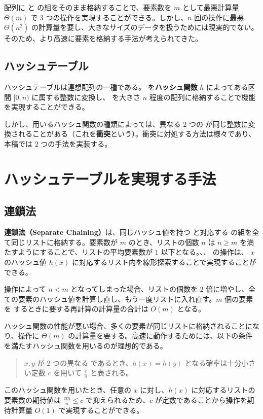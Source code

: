 \documentclass[dvipdfmx,a4j,10pt]{jarticle}
\begin{document}
配列に  と  の組をそのまま格納することで、要素数を $m$ として最悪計算量 $\Theta (m)$ で $3$ つの操作を実現することができる。しかし、$n$ 回の操作に最悪 $\Theta (n^2)$ の計算量を要し、大きなサイズのデータを扱うためには現実的でない。そのため、より高速に要素を格納する手法が考えられてきた。

\subsection{ハッシュテーブル}

ハッシュテーブルは連想配列の一種である。 を\textbf{ハッシュ関数} $h$ によってある区間 $[0, n)$ に属する整数に変換し、 を大きさ $n$ 程度の配列に格納することで機能を実現することができる。

しかし、用いるハッシュ関数の種類によっては、異なる $2$ つの  が同じ整数に変換されることがある（これを\textbf{衝突}という）。衝突に対処する方法は様々であり、本稿では $2$ つの手法を実装する。

\section{ハッシュテーブルを実現する手法}

\subsection{連鎖法}
\label{連鎖法}

\textbf{連鎖法（Separate Chaining）}\cite{データ構造}は、同じハッシュ値を持つ  と対応する  の組を全て同じリストに格納する。要素数が $m$ のとき、リストの個数 $n$ は $n \geq m$ を満たすようにすることで、リストの平均要素数が $1$ 以下となる。、、 の操作は、 $x$ のハッシュ値 $h(x)$ に対応するリスト内を線形探索することで実現することができる。

 操作によって $n < m$ となってしまった場合、リストの個数を $2$ 倍に増やし、全ての要素のハッシュ値を計算し直し、もう一度リストに入れ直す。$m$ 個の要素を  するときに要する再計算の計算量の合計は $O(m)$ となる。

ハッシュ関数の性能が悪い場合、多くの要素が同じリストに格納されることになり、操作に $\Theta (m)$ の計算量を要する。高速に動作するためには、以下の条件を満たすハッシュ関数を用いるのが理想的である。
\begin{quotation}
\noindent $x, y$ が $2$ つの異なる  であるとき、$h(x) = h(y)$ となる確率は十分小さい定数 $c$ を用いて $\displaystyle \frac{c}{n}$ と表される。
\end{quotation}
このハッシュ関数を用いたとき、任意の  $x$ に対し、$h(x)$ に対応するリストの要素数の期待値は $\displaystyle \frac{cm}{n} \leq c$ で抑えられるため、$c$ が定数であることから操作を期待計算量 $O(1)$ で実現することができる。
\end{document}
